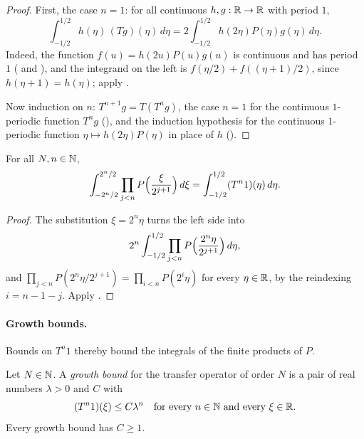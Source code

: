 \begin{proof}
\leanok
{}
First, the case $n = 1$: for all continuous $h, g : \mathbb{R} \to \mathbb{R}$ with period $1$,
\[
  \int_{-1/2}^{1/2} h(\eta) \, (T g)(\eta) \, d\eta
  = 2 \int_{-1/2}^{1/2} h(2\eta) P(\eta) g(\eta) \, d\eta .
\]
Indeed, the function $f(u) = h(2u) P(u) g(u)$ is continuous and has period $1$
( and ), and the integrand on the left is
$f(\eta/2) + f((\eta + 1)/2)$, since $h(\eta + 1) = h(\eta)$; apply .

Now induction on $n$: $T^{n+1} g = T (T^n g)$, the case $n = 1$ for the continuous $1$-periodic
function $T^n g$ (), and the induction hypothesis for the
continuous $1$-periodic function $\eta \mapsto h(2\eta) P(\eta)$ in place of $h$
().
\end{proof}

\begin{proposition}
\label{prop:daub-transfer-products}
\leanok
{}
For all $N, n \in \mathbb{N}$,
\[
  \int_{-2^n/2}^{2^n/2} \prod_{j<n} P\Bigl(\frac{\xi}{2^{j+1}}\Bigr) \, d\xi
  = \int_{-1/2}^{1/2} (T^n 1)(\eta) \, d\eta .
\]
\end{proposition}

\begin{proof}
\leanok
{}
The substitution $\xi = 2^n \eta$ turns the left side into
\[
  2^n \int_{-1/2}^{1/2} \prod_{j<n} P\Bigl(\frac{2^n \eta}{2^{j+1}}\Bigr) \, d\eta ,
\]
and $\prod_{j<n} P(2^n \eta/2^{j+1}) = \prod_{i<n} P(2^i \eta)$ for every $\eta \in \mathbb{R}$, by the
reindexing $i = n - 1 - j$. Apply .
\end{proof}

\paragraph{Growth bounds.}
Bounds on $T^n 1$ thereby bound the integrals of the finite products of $P$.

\begin{definition}
\label{def:daub-transfer-growth}
\leanok
{}
Let $N \in \mathbb{N}$. A \emph{growth bound} for the transfer operator of order $N$ is a pair of real
numbers $\lambda > 0$ and $C$ with
\[
  (T^n 1)(\xi) \leq C \lambda^n \quad\text{for every } n \in \mathbb{N} \text{ and every } \xi \in \mathbb{R} .
\]
Every growth bound has $C \geq 1$.
\end{definition}

